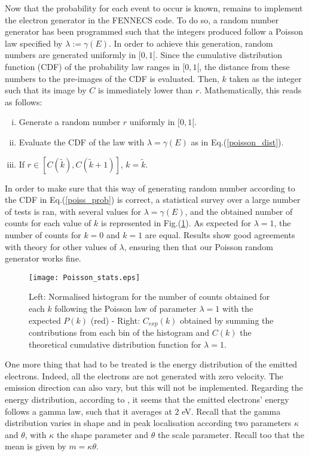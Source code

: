 \noindent Now that the probability for each event to occur is known, remains to implement the electron generator in the FENNECS code. To do so, a random number generator has been programmed such that the integers produced follow a Poisson law specified by $\lambda := \gamma(E)$. In order to achieve this generation, random numbers are generated uniformly in $[0,1[$. Since the cumulative distribution function (CDF) of the probability law ranges in $[0,1[$, the distance from these numbers to the pre-images of the CDF is evaluated. Then, $k$ taken as the integer such that its image by $C$ is immediately lower than $r$. Mathematically, this reads as follows: 


\begin{enumerate}[i)]
\item{Generate a random number $r$ uniformly  in $[0,1[. $}
\item{Evaluate the CDF of the law with $\lambda = \gamma(E)$ as in Eq.(\ref{poisson_dist}).}
\item{If $r \in [C(\tilde{k}), C(\tilde{k}+1)]$, $k=\tilde{k}$}.
\end{enumerate}


\noindent In order to make sure that this way of generating random number according to the CDF in Eq.(\ref{poiss_prob}) is correct, a statistical survey over a large number of tests is ran, with several values for $\lambda = \gamma(E)$, and the obtained number of counts for each value of $k$ is represented in Fig.(\ref{Poisson_stat}). As expected for $\lambda=1$, the number of counts for $k=0$ and $k=1$ are equal. Results show good agreements with theory for other values of $\lambda$, ensuring then that our Poisson random generator works fine. \\

\begin{figure}[h!]
\centering
	\texttt{[image: Poisson\_stats.eps]}
	\caption{\label{Poisson_stat} Left: Normalised histogram for the number of counts obtained for each $k$ following the Poisson law of parameter $\lambda = 1$ with the expected $P(k)$ (red) - Right: $C_{exp}(k)$ obtained by summing the contributions from each bin of the histogram and $C(k)$ the theoretical cumulative distribution function for $\lambda = 1$. }
\end{figure}  

One more thing that had to be treated is the energy distribution of the emitted electrons. Indeed, all the electrons are not generated with zero velocity. The emission direction can also vary, but this will not be implemented.  Regarding the energy distribution, according to \cite{HasselII, Pagonakis}, it seems that the emitted electrons' energy follows a gamma law, such that it averages at $2$ eV. Recall that the gamma distribution varies in shape and in peak localisation according two parameters $\kappa$ and $\theta$, with $\kappa$ the shape parameter and $\theta$ the scale parameter. Recall too that the mean is given by $m=\kappa \theta$. \\

